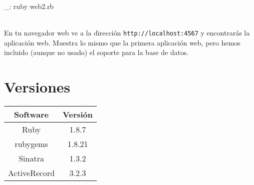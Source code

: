 \begin{bashcode}
_: ruby web2.rb
\end{bashcode}
\\

En tu navegador web ve a la dirección \texttt{http://localhost:4567} y encontrarás la aplicación web. Muestra lo mismo que la primera aplicación web, pero hemos incluido (aunque no usado) el soporte para la base de datos.


\section{Versiones}

\begin{tabular}{|c|c|}
   \hline
   Software & Versión \\ \hline
   Ruby & 1.8.7 \\ \hline
   rubygems & 1.8.21 \\ \hline
   Sinatra & 1.3.2 \\ \hline
   ActiveRecord & 3.2.3 \\ \hline
\end{tabular}
